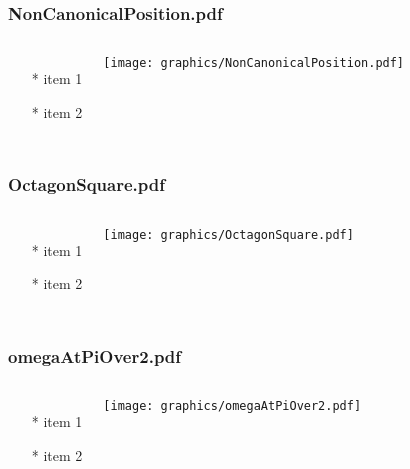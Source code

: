 \documentclass{beamer}
\begin{document}
\begin{frame} \frametitle{NonCanonicalPosition.pdf}
    \begin{columns}[c]
        \begin{itemize}
            \item[*] item 1
            \item[*] item 2
        \end{itemize}
        \begin{minipage}{\linewidth}
            \begin{center}
            \texttt{[image: graphics/NonCanonicalPosition.pdf]}
            \label{gfx:NonCanonicalPosition.pdf}
            \end{center}
        \end{minipage}
    \end{columns}
\end{frame}
\begin{frame} \frametitle{OctagonSquare.pdf}
    \begin{columns}[c]
        \begin{itemize}
            \item[*] item 1
            \item[*] item 2
        \end{itemize}
        \begin{minipage}{\linewidth}
            \begin{center}
            \texttt{[image: graphics/OctagonSquare.pdf]}
            \label{gfx:OctagonSquare.pdf}
            \end{center}
        \end{minipage}
    \end{columns}
\end{frame}
\begin{frame} \frametitle{omegaAtPiOver2.pdf}
    \begin{columns}[c]
        \begin{itemize}
            \item[*] item 1
            \item[*] item 2
        \end{itemize}
        \begin{minipage}{\linewidth}
            \begin{center}
            \texttt{[image: graphics/omegaAtPiOver2.pdf]}
            \label{gfx:omegaAtPiOver2.pdf}
            \end{center}
        \end{minipage}
    \end{columns}
\end{frame}
\end{document}
